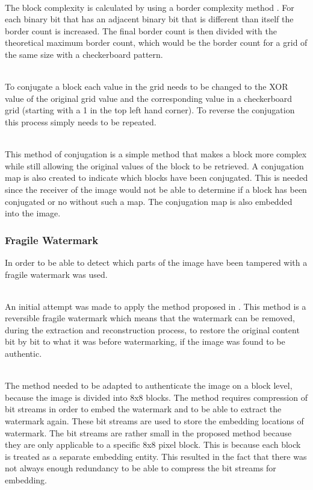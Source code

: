 \documentclass[12pt]{article}
\begin{document}
\hspace{0pt} \\
The block complexity is calculated by using a border complexity method \cite{beaullieubpcs}. 
For each binary bit that has an adjacent binary bit that is different than itself the border count is increased. 
The final border count is then divided with the theoretical maximum border count, which would be the border count for a grid of the same size with a checkerboard pattern.

\hspace{0pt} \\
To conjugate a block each value in the grid needs to be changed to the XOR value of the original grid value and the corresponding value in a checkerboard grid (starting with a 1 in the top left hand corner).
To reverse the conjugation this process simply needs to be repeated.

\hspace{0pt} \\
This method of conjugation is a simple method that makes a block more complex while still allowing the original values of the block to be retrieved.
A conjugation map is also created to indicate which blocks have been conjugated.
This is needed since the receiver of the image would not be able to determine if a block has been conjugated or no without such a map.
The conjugation map is also embedded into the image.

\subsubsection{Fragile Watermark}
\label{impFragileWatermark}
In order to be able to detect which parts of the image have been tampered with a fragile watermark was used.

\hspace{0pt} \\
An initial attempt was made to apply the method proposed in \cite{tian2002wavelet}.
This method is a reversible fragile watermark which means that the watermark can be removed, during the extraction and reconstruction process, to restore the original content bit by bit to what it was before watermarking, if the image was found to be authentic.

\hspace{0pt} \\
The method needed to be adapted to authenticate the image on a block level, because the image is divided into 8x8 blocks.
The method requires compression of bit streams in order to embed the watermark and to be able to extract the watermark again.
These bit streams are used to store the embedding locations of watermark.
The bit streams are rather small in the proposed method because they are only applicable to a specific 8x8 pixel block. 
This is because each block is treated as a separate embedding entity.
This resulted in the fact that there was not always enough redundancy to be able to compress the bit streams for embedding.
\end{document}
